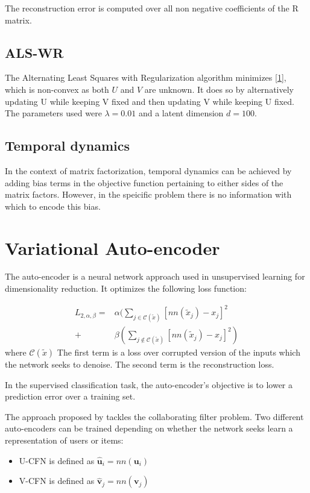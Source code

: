 \documentclass[10pt,twocolumn]{article}
\begin{document}
The reconstruction error is computed over all non negative coefficients of the R matrix. 

\subsection{ALS-WR}

The Alternating Least Squares with Regularization algorithm \cite{zhou2008large}  minimizes \eqref{1}, which is non-convex as both $U$ and $V$ are unknown. It does so by alternatively updating U while keeping V fixed and then updating V while keeping U fixed. The parameters used were $\lambda = 0.01$ and a latent dimension $d = 100$.

\subsection{Temporal dynamics}
In the context of matrix factorization, temporal dynamics can be achieved by adding bias terms in the objective function pertaining to either sides of the matrix factors. However, in the speicific problem there is no information with which to encode this bias.

\section{Variational Auto-encoder}

The auto-encoder is a neural network approach used in unsupervised learning for dimensionality reduction. It optimizes the following loss function:

\begin{equation}
\begin{split}
L_{2, \alpha, \beta} = &\alpha ( \sum_{j \in \mathcal{C}(\tilde{x})} [ nn(\tilde{x}_j) - x_j ]^2 \\
+ & \beta ( \sum_{j \notin \mathcal{C}(\tilde{x})} [nn(\tilde{x}_j) - x_j ]^2)
\end{split}
\end{equation}
where $\mathcal{C}(\tilde{x})$ The first term is a loss over corrupted version of the inputs which the network seeks to denoise. The second term is the reconstruction loss.

In the supervised classification task, the auto-encoder's objective is to lower a prediction error over a training set.

The approach proposed by \cite{strub2016hybrid} tackles the collaborating filter problem. Two different auto-encoders can be trained depending on whether the network seeks learn a representation of users or items:
\begin{itemize}
\item U-CFN is defined as $\hat{\textbf{u}}_i = nn(\textbf{u}_i)$
\item V-CFN is defined as $\hat{\textbf{v}}_j = nn(\textbf{v}_j)$ 
\end{itemize}
\end{document}
